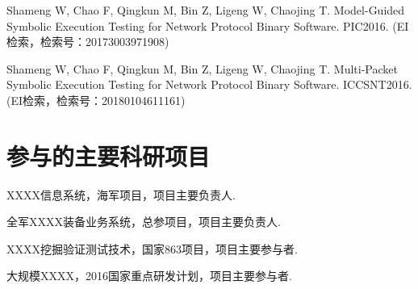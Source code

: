 \begin{resume}
\begin{enumerate}[{[}1{]}]
  \item Shameng W, Chao F, Qingkun M, Bin Z, Ligeng W, Chaojing T. Model-Guided
  Symbolic Execution Testing for Network Protocol Binary Software. PIC2016. (EI
  检索，检索号：20173003971908)
  
  \item Shameng W, Chao F, Qingkun M, Bin Z, Ligeng W, Chaojing T. Multi-Packet
  Symbolic Execution Testing for Network Protocol Binary Software. ICCSNT2016.
  (EI检索，检索号：20180104611161)
  
  
  \end{enumerate}

  \section*{参与的主要科研项目} %
  \begin{enumerate}[{[}1{]}]
  \addtolength{\itemsep}{-.36\baselineskip}%
  \item XXXX信息系统，海军项目，项目主要负责人.
  \item 全军XXXX装备业务系统，总参项目，项目主要负责人.
  \item XXXX挖掘验证测试技术，国家863项目，项目主要参与者.
  \item 大规模XXXX，2016国家重点研发计划，项目主要参与者.
  \end{enumerate}
\end{resume}
